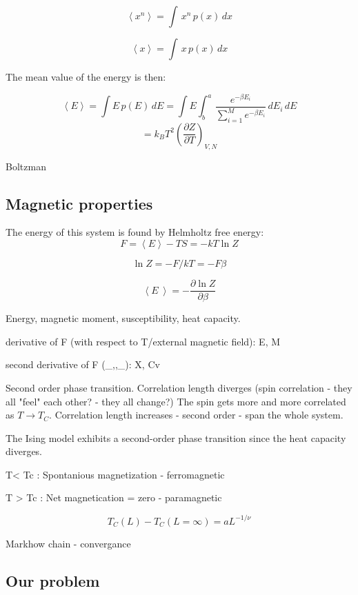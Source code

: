 \begin{equation}\label{eq:moment}
\left< x^n \right> = \int \,x^n \,p(x)\,dx
\end{equation}

\begin{equation}\label{eq:mean_value}
\left< x \right> = \int \,x \,p(x)\,dx
\end{equation}

The mean value of the energy is then:

\[
\left< E \right> = \int E \,p(E)\, dE = \int E \int_b^a\, \frac{e^{-\beta E_i}}{\sum_{i=1}^M e^{-\beta E_i}}\, dE_i\,dE
\]
\[
= k_B T^2 \left( \frac{\partial Z}{\partial T}\right)_{V,N}
\]

Boltzman

\subsection{Magnetic properties}

The energy of this system is found by 
Helmholtz free energy:
\[
F = \left< E \right> - TS = -kT \ln Z
\]

\[
\ln Z = -F/kT = -F\beta
\]

\[
\left< E\ \right> = -\frac{\partial \ln Z}{\partial \beta}
\]

Energy, magnetic moment, susceptibility, heat capacity.

derivative of F (with respect to T/external magnetic field): E, M

second derivative of F (\_,,\_): X, Cv

Second order phase transition.
    Correlation length diverges (spin correlation - they all "feel" each other? - they all change?)
    The spin gets more and more correlated as $T \rightarrow T_C$. Correlation length increases - second order - span the whole system.
    
The Ising model exhibits a second-order phase transition since the heat capacity diverges.

T< Tc : Spontanious magnetization - ferromagnetic

T > Tc : Net magnetication = zero - paramagnetic

\begin{equation}\label{eq:critical_T}
T_C(L) - T_C(L=\infty) = a L^{-1/\nu}
\end{equation}

Markhow chain - convergance

\subsection{Our problem}

